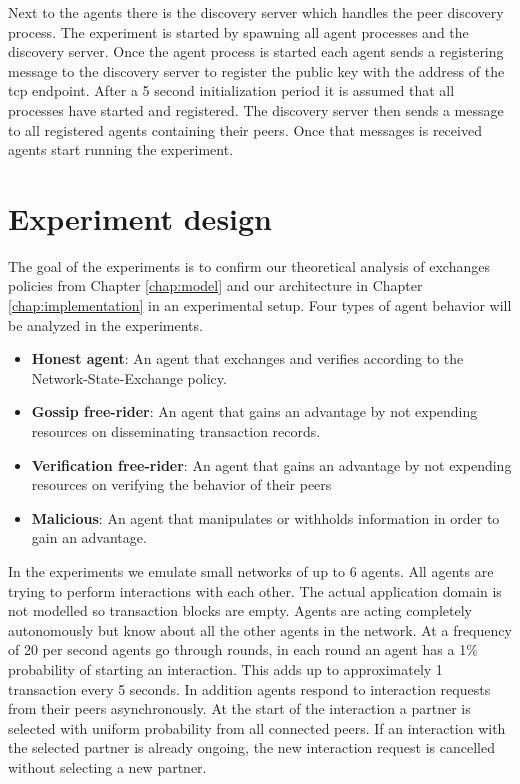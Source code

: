 Next to the agents there is the discovery server which handles the peer discovery process. The 
experiment is started by spawning all agent processes and the discovery server. Once the agent 
process is started each agent sends a registering message to the discovery server to register the 
public key with the address of the tcp endpoint. After a 5 second initialization period it is assumed
that all processes have started and registered. The discovery server then sends a message to all 
registered agents containing their peers. Once that messages is received agents start running the
experiment. 

\section{Experiment design}
The goal of the experiments is to confirm our theoretical analysis of exchanges policies from Chapter 
\ref{chap:model} and our architecture in Chapter \ref{chap:implementation} in an experimental setup.
Four types of agent behavior will be analyzed in the experiments.

\begin{itemize}
    \item \textbf{Honest agent}: An agent that exchanges and verifies according to the Network-State-Exchange
    policy.
    \item \textbf{Gossip free-rider}: An agent that gains an advantage by not 
    expending resources on disseminating transaction records.
    \item \textbf{Verification free-rider}: An agent that gains an advantage by not expending 
    resources on verifying the behavior of their peers
    \item \textbf{Malicious}: An agent that manipulates or withholds information in order to gain an
    advantage. 
\end{itemize}


In the experiments we emulate small networks of up to 6 agents. All agents are trying to perform 
interactions with each other. The actual application domain is not modelled so transaction blocks 
are empty. Agents are acting completely autonomously but know about all the other agents in the network. 
At a frequency of 20 per second agents go through rounds, in each round an agent has a 1\% probability 
of starting an interaction. This adds up to approximately 1 transaction every 5 seconds. In addition 
agents respond to interaction requests from their peers asynchronously. 
At the start of the interaction a partner is selected with uniform probability from all connected peers. If an interaction with 
the selected partner is already ongoing, the new interaction request is cancelled without selecting a new partner. 

